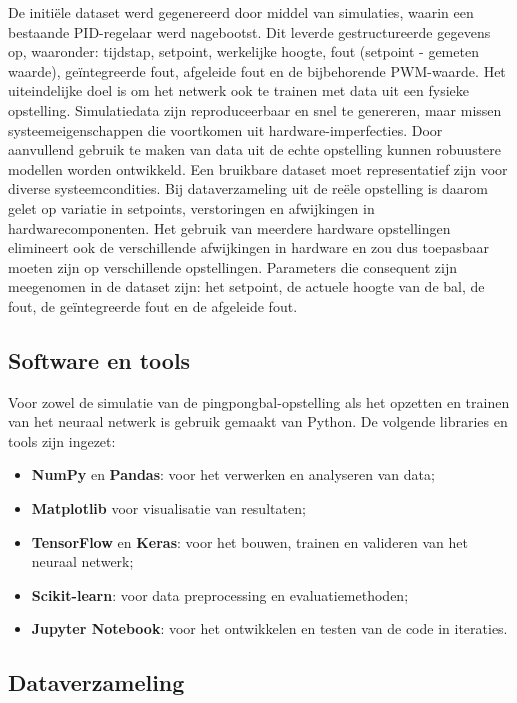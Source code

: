 De initiële dataset werd gegenereerd door middel van simulaties, waarin een bestaande PID-regelaar werd nagebootst. Dit leverde gestructureerde gegevens op, waaronder: tijdstap, setpoint, werkelijke hoogte, fout (setpoint - gemeten waarde), geïntegreerde fout, afgeleide fout en de bijbehorende PWM-waarde.
Het uiteindelijke doel is om het netwerk ook te trainen met data uit een fysieke opstelling. Simulatiedata zijn reproduceerbaar en snel te genereren, maar missen systeemeigenschappen die voortkomen uit hardware-imperfecties. Door aanvullend gebruik te maken van data uit de echte opstelling kunnen robuustere modellen worden ontwikkeld.
Een bruikbare dataset moet representatief zijn voor diverse systeemcondities. Bij dataverzameling uit de reële opstelling is daarom gelet op variatie in setpoints, verstoringen en afwijkingen in hardwarecomponenten. Het gebruik van meerdere hardware opstellingen elimineert ook de verschillende afwijkingen in hardware en zou dus toepasbaar moeten zijn op verschillende opstellingen. Parameters die consequent zijn meegenomen in de dataset zijn: het setpoint, de actuele hoogte van de bal, de fout, de geïntegreerde fout en de afgeleide fout.



\subsection{Software en tools}

Voor zowel de simulatie van de pingpongbal-opstelling als het opzetten en trainen van het neuraal netwerk is gebruik gemaakt van Python. De volgende libraries en tools zijn ingezet:
\begin{itemize}
    \item \textbf{NumPy} en \textbf{Pandas}: voor het verwerken en analyseren van data;
    \item \textbf{Matplotlib} voor visualisatie van resultaten;
    \item \textbf{TensorFlow} en \textbf{Keras}: voor het bouwen, trainen en valideren van het neuraal netwerk;
    \item \textbf{Scikit-learn}: voor data preprocessing en evaluatiemethoden;
    \item \textbf{Jupyter Notebook}: voor het ontwikkelen en testen van de code in iteraties.
\end{itemize}

\subsection{Dataverzameling}

